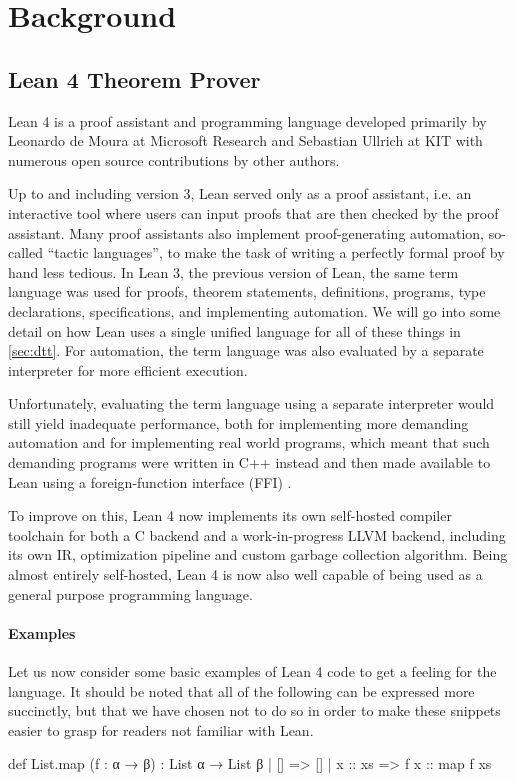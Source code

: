\chapter{Background}\label{sec:background}

\section{Lean 4 Theorem Prover}\label{sec:lean4}
Lean 4 is a proof assistant and programming language developed primarily by Leonardo de Moura at Microsoft Research and Sebastian Ullrich at KIT with numerous open source contributions by other authors.

Up to and including version 3, Lean served only as a proof assistant, i.e. an interactive tool where users can input proofs that are then checked by the proof assistant. Many proof assistants also implement proof-generating automation, so-called ``tactic languages'', to make the task of writing a perfectly formal proof by hand less tedious. In Lean 3, the previous version of Lean, the same term language was used for proofs, theorem statements, definitions, programs, type declarations, specifications, and implementing automation. We will go into some detail on how Lean uses a single unified language for all of these things in \cref{sec:dtt}. For automation, the term language was also evaluated by a separate interpreter for more efficient execution.

Unfortunately, evaluating the term language using a separate interpreter would still yield inadequate performance, both for implementing more demanding automation and for implementing real world programs, which meant that such demanding programs were written in C++ instead and then made available to Lean using a foreign-function interface (FFI) \citep{ullrich_counting_2020}.

To improve on this, Lean 4 now implements its own self-hosted compiler toolchain for both a C backend and a work-in-progress LLVM backend, including its own IR, optimization pipeline and custom garbage collection algorithm. Being almost entirely self-hosted, Lean 4 is now also well capable of being used as a general purpose programming language.

\subsubsection{Examples}
Let us now consider some basic examples of Lean 4 code to get a feeling for the language. It should be noted that all of the following can be expressed more succinctly, but that we have chosen not to do so in order to make these snippets easier to grasp for readers not familiar with Lean.\\
\begin{code}
def List.map (f : α → β) : List α → List β
  | []      => []
  | x :: xs => f x :: map f xs
\end{code}

